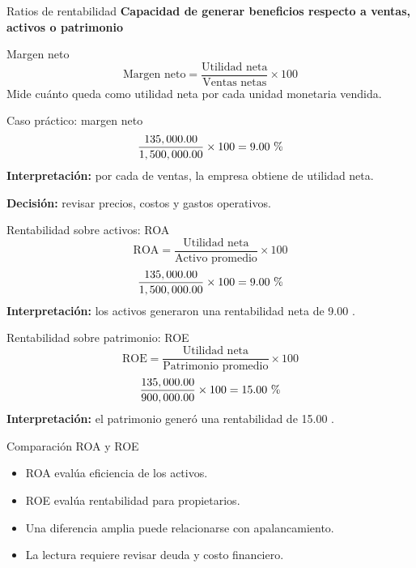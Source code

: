 \begin{frame}{Ratios de rentabilidad}
\color{rentabilidad}\textbf{Capacidad de generar beneficios respecto a ventas, activos o patrimonio}\color{black}
\end{frame}

\begin{frame}{Margen neto}
\[
\text{Margen neto}=\frac{\text{Utilidad neta}}{\text{Ventas netas}}\times 100
\]
Mide cuánto queda como utilidad neta por cada unidad monetaria vendida.
\end{frame}

\begin{frame}{Caso práctico: margen neto}
\casoeducativo
\[
\frac{135,000.00}{1,500,000.00}\times 100=9.00\text{ \char37}
\]
\textbf{Interpretación:} por cada  de ventas, la empresa obtiene  de utilidad neta.

\textbf{Decisión:} revisar precios, costos y gastos operativos.
\end{frame}

\begin{frame}{Rentabilidad sobre activos: ROA}
\[
\text{ROA}=\frac{\text{Utilidad neta}}{\text{Activo promedio}}\times 100
\]
\[
\frac{135,000.00}{1,500,000.00}\times 100=9.00\text{ \char37}
\]
\textbf{Interpretación:} los activos generaron una rentabilidad neta de 9.00 .
\end{frame}

\begin{frame}{Rentabilidad sobre patrimonio: ROE}
\[
\text{ROE}=\frac{\text{Utilidad neta}}{\text{Patrimonio promedio}}\times 100
\]
\[
\frac{135,000.00}{900,000.00}\times 100=15.00\text{ \char37}
\]
\textbf{Interpretación:} el patrimonio generó una rentabilidad de 15.00 .
\end{frame}

\begin{frame}{Comparación ROA y ROE}
\begin{itemize}
  \item ROA evalúa eficiencia de los activos.
  \item ROE evalúa rentabilidad para propietarios.
  \item Una diferencia amplia puede relacionarse con apalancamiento.
  \item La lectura requiere revisar deuda y costo financiero.
\end{itemize}
\end{frame}
